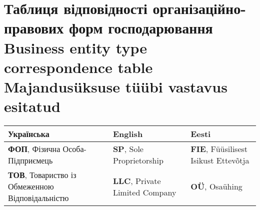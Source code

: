 \pagebreak
\section{Таблиця відповідності організаційно-правових форм господарювання\\Business entity type correspondence table\\Majandusüksuse tüübi vastavus esitatud}
\label{app:correspondence}
\begin{tabular}{ | l | l | l |}
  \hline
    \textbf{Українська} & \textbf{English} & \textbf{Eesti} \\
    \hline
    \textbf{ФОП}, Фізична Особа-Підприємець & \textbf{SP}, Sole Proprietorship & \textbf{FIE}, Füüsilisest Isikust Ettevõtja \\
    \textbf{ТОВ}, Товариство із Обмеженною Відповідальністю & \textbf{LLC}, Private Limited Company & \textbf{OÜ}, Osaühing \\
  \hline
\end{tabular}
